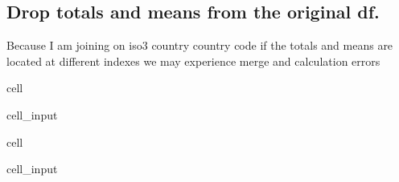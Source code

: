 \documentclass[letterpaper,10pt,english]{jupyterBook}
\begin{document}
\subsection{Drop totals and means from the original df.}
\label{\detokenize{notebooks/data_exploration:drop-totals-and-means-from-the-original-df}}
\sphinxAtStartPar
Because I am joining on iso3 country country code if the totals and means are located at different indexes we may experience merge and calculation errors

\begin{sphinxuseclass}{cell}\begin{sphinxVerbatimInput}

\begin{sphinxuseclass}{cell_input}
\begin{sphinxVerbatim}[commandchars=\\\{\}]
  \PYG{p}{[}\PYG{p}{[}\PYG{p}{]}    \PYG{p}{[}\PYG{p}{]}  \PYG{p}{]}
\end{sphinxVerbatim}

\end{sphinxuseclass}\end{sphinxVerbatimInput}

\end{sphinxuseclass}
\begin{sphinxuseclass}{cell}\begin{sphinxVerbatimInput}

\begin{sphinxuseclass}{cell_input}
\begin{sphinxVerbatim}[commandchars=\\\{\}]
  \PYG{p}{[}\PYG{p}{[}\PYG{p}{]}    \PYG{p}{[}\PYG{p}{]}  \PYG{p}{]}
\end{sphinxVerbatim}

\end{sphinxuseclass}\end{sphinxVerbatimInput}

\end{sphinxuseclass}
\end{document}
